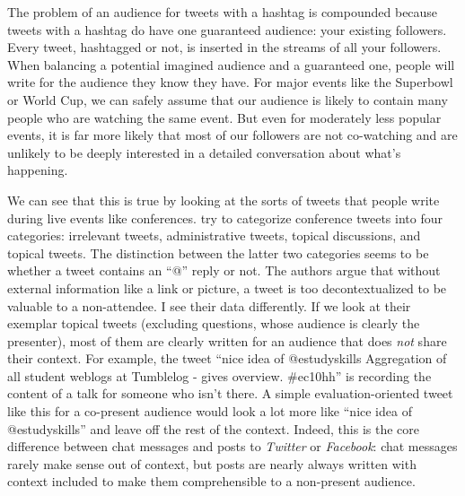 The problem of an audience for tweets with a hashtag is compounded because tweets with a hashtag do have one guaranteed audience: your existing followers. Every tweet, hashtagged or not, is inserted in the streams of all your followers. When balancing a potential imagined audience and a guaranteed one, people will write for the audience they know they have. For major events like the Superbowl or World Cup, we can safely assume that our audience is likely to contain many people who are watching the same event. But even for moderately less popular events, it is far more likely that most of our followers are not co-watching and are unlikely to be deeply interested in a detailed conversation about what's happening. 

We can see that this is true by looking at the sorts of tweets that people write during live events like conferences. \citet{Ebner:2010tx} try to categorize conference tweets into four categories: irrelevant tweets, administrative tweets, topical discussions, and topical tweets. The distinction between the latter two categories seems to be whether a tweet contains an ``@'' reply or not. The authors argue that without external information like a link or picture, a tweet is too decontextualized to be valuable to a non-attendee. I see their data differently. If we look at their exemplar topical tweets (excluding questions, whose audience is clearly the presenter), most of them are clearly written for an audience that does \emph{not} share their context.  For example, the tweet ``nice idea of @estudyskills Aggregation of all student weblogs at Tumblelog - gives overview. #ec10hh'' is recording the content of a talk for someone who isn't there. A simple evaluation-oriented tweet like this for a co-present audience would look a lot more like ``nice idea of @estudyskills'' and leave off the rest of the context. Indeed, this is the core difference between chat messages and posts to \emph{Twitter} or \emph{Facebook}: chat messages rarely make sense out of context, but posts are nearly always written with context included to make them comprehensible to a non-present audience. 


